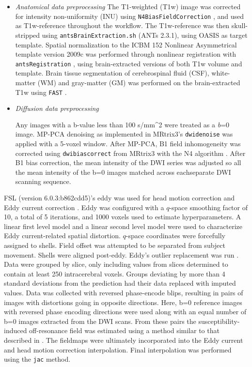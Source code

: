 \documentclass[10pt,%
               aps,%
               prl,%
               reprint,%
               superscriptaddress,%
               preprintnumbers,%
               linenumbers,%
               amsmath,%
               floatfix]{revtex4-2}
\begin{document}
\begin{enumerate}
\begin{itemize}

\item {\it Anatomical data preprocessing}
The T1-weighted (T1w) image was corrected for intensity non-uniformity
(INU) using \texttt{N4BiasFieldCorrection} \cite[ANTs 2.3.1]{n4}, and
used as T1w-reference throughout the workflow. The T1w-reference was
then skull-stripped using \texttt{antsBrainExtraction.sh} (ANTs 2.3.1),
using OASIS as target template. Spatial normalization to the ICBM 152
Nonlinear Asymmetrical template version 2009c
\cite[RRID:SCR\_008796]{mni} was performed through nonlinear
registration with \texttt{antsRegistration} \cite[ANTs 2.3.1,
RRID:SCR\_004757]{ants}, using brain-extracted versions of both T1w
volume and template. Brain tissue segmentation of cerebrospinal fluid
(CSF), white-matter (WM) and gray-matter (GM) was performed on the
brain-extracted T1w using \texttt{FAST} \cite[FSL 6.0.3:b862cdd5,
RRID:SCR\_002823]{fsl_fast}.

\item {\it Diffusion data preprocessing}

Any images with a b-value less than 100 s/mm\^{}2 were treated as a
\emph{b}=0 image. MP-PCA denoising as implemented in MRtrix3's
\texttt{dwidenoise}\cite{dwidenoise1} was applied with a 5-voxel
window. After MP-PCA, B1 field inhomogeneity was corrected using
\texttt{dwibiascorrect} from MRtrix3 with the N4 algorithm \cite{n4}.
After B1 bias correction, the mean intensity of the DWI series was
adjusted so all the mean intensity of the b=0 images matched across
eachseparate DWI scanning sequence.
\end{itemize}

FSL (version 6.0.3:b862cdd5)'s eddy was used for head motion correction
and Eddy current correction \cite{anderssoneddy}. Eddy was configured
with a \(q\)-space smoothing factor of 10, a total of 5 iterations, and
1000 voxels used to estimate hyperparameters. A linear first level model
and a linear second level model were used to characterize Eddy
current-related spatial distortion. \(q\)-space coordinates were
forcefully assigned to shells. Field offset was attempted to be
separated from subject movement. Shells were aligned post-eddy. Eddy's
outlier replacement was run \cite{eddyrepol}. Data were grouped by
slice, only including values from slices determined to contain at least
250 intracerebral voxels. Groups deviating by more than 4 standard
deviations from the prediction had their data replaced with imputed
values. Data was collected with reversed phase-encode blips, resulting
in pairs of images with distortions going in opposite directions. Here,
b=0 reference images with reversed phase encoding directions were used
along with an equal number of b=0 images extracted from the DWI scans.
From these pairs the susceptibility-induced off-resonance field was
estimated using a method similar to that described in \cite{topup}. The
fieldmaps were ultimately incorporated into the Eddy current and head
motion correction interpolation. Final interpolation was performed using
the \texttt{jac} method.


\end{enumerate}
\end{document}
